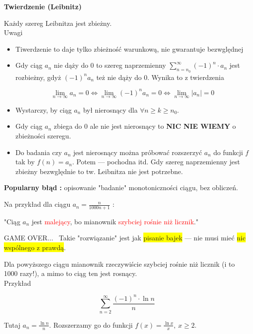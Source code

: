 \textbf{Twierdzenie (Leibnitz)}

Każdy szereg Leibnitza jest zbieżny. \\

Uwagi

\begin{itemize}
    \item Tiwerdzenie to daje tylko zbieżność warunkową, nie gwarantuje bezwględnej
    \item Gdy ciąg $a_n$ nie dąży do 0 to szereg naprzemienny $ \sum\limits_{n = n_0}^{\infty} (-1)^n \cdot a_n $ jest
    rozbieżny, gdyż $(-1)^n a_n$ też nie dąży do 0. Wynika to z twierdzenia

    $$ \lim_{n \to \infty} a_n = 0 \Leftrightarrow \lim_{n \to \infty} (-1)^n a_n = 0 \Leftrightarrow \lim_{n \to \infty} |a_n| = 0$$

    \item Wystarczy, by ciąg $a_n$ był nierosnący dla $ \forall n \geq k \geq n_0$.
    \item Gdy ciąg $a_n$ zbiega do 0 ale nie jest nierosnący to \textbf{NIC NIE WIEMY} o zbieżności szeregu.
    \item Do badania czy $a_n$ jest nierosnący można próbować rozszerzyć $a_n$ do funkcji $f$ tak by $f(n) = a_n$.
    Potem --- pochodna itd.
    Gdy szereg naprzemienny jest zbieżny bezwględnie to tw. Leibnitza nie jest potrzebne. \\
\end{itemize}

\textbf{Popularny błąd : } opisowanie "badanie" monotoniczności ciągu, bez obliczeń.

Na przykład dla ciągu $ a_n = \frac{n}{1000n + 1} $ :

"Ciąg $a_n$ jest \textcolor{red}{malejący}, bo mianownik \textcolor{red}{szybciej rośnie niż licznik}."

GAME OVER... \ Takie "rozwiązanie" jest jak \colorbox{yellow}{pisanie bajek} --- nie musi mieć \linebreak
\colorbox{yellow}{nic wspólnego z prawdą}.

Dla powyższego ciągu mianownik rzeczywiście szybciej rośnie niż licznik (i to 1000 razy!), a mimo to ciąg ten jest rosnący. \\

Przykład

$$ \sum\limits_{n=2}^{\infty} \frac{(-1)^n \cdot \ln n}{n} $$

Tutaj $ a_n = \frac{\ln n}{n} $. Rozszerzamy go do funkcji $ f(x) = \frac{\ln x}{x}, \ x \geq 2 $.

